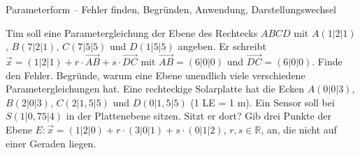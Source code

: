 \begin{aufgabe}{Parameterform – Fehler finden, Begründen, Anwendung, Darstellungswechsel}
\begin{teile}
\teil Tim soll eine Parametergleichung der Ebene des Rechtecks $ABCD$ mit $A(1 | 2 | 1)$, $B(7 | 2 | 1)$, $C(7 | 5 | 5)$ und $D(1 | 5 | 5)$ angeben. Er schreibt $\vec x = (1 | 2 | 1) + r \cdot \overrightarrow{AB} + s \cdot \overrightarrow{DC}$ mit $\overrightarrow{AB} = (6 | 0 | 0)$ und $\overrightarrow{DC} = (6 | 0 | 0)$. Finde den Fehler.
\teil Begründe, warum eine Ebene unendlich viele verschiedene Parametergleichungen hat.
\teil Eine rechteckige Solarplatte hat die Ecken $A(0 | 0 | 3)$, $B(2 | 0 | 3)$, $C(2 | 1{,}5 | 5)$ und $D(0 | 1{,}5 | 5)$ (1 LE = 1 m). Ein Sensor soll bei $S(1 | 0{,}75 | 4)$ in der Plattenebene sitzen. Sitzt er dort?
\teil Gib drei Punkte der Ebene $E\colon \vec x = (1 | 2 | 0) + r \cdot (3 | 0 | 1) + s \cdot (0 | 1 | 2)$, $r, s \in \mathbb{R}$, an, die nicht auf einer Geraden liegen.
\end{teile}
\end{aufgabe}
